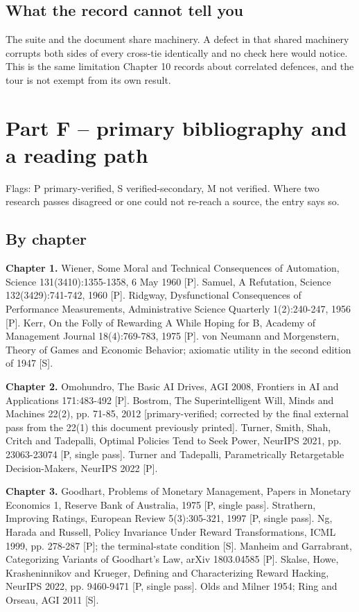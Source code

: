 \section*{What the record cannot tell you}

The suite and the document share machinery. A defect in that shared machinery corrupts both sides of every cross-tie identically and no check here would notice. This is the same limitation Chapter 10 records about correlated defences, and the tour is not exempt from its own result.

\chapter*{Part F -- primary bibliography and a reading path}

Flags: P primary-verified, S verified-secondary, M not verified. Where two research passes disagreed or one could not re-reach a source, the entry says so.

\section*{By chapter}

\textbf{Chapter 1.} Wiener, Some Moral and Technical Consequences of Automation, Science 131(3410):1355-1358, 6 May 1960 [P]. Samuel, A Refutation, Science 132(3429):741-742, 1960 [P]. Ridgway, Dysfunctional Consequences of Performance Measurements, Administrative Science Quarterly 1(2):240-247, 1956 [P]. Kerr, On the Folly of Rewarding A While Hoping for B, Academy of Management Journal 18(4):769-783, 1975 [P]. von Neumann and Morgenstern, Theory of Games and Economic Behavior; axiomatic utility in the second edition of 1947 [S].

\textbf{Chapter 2.} Omohundro, The Basic AI Drives, AGI 2008, Frontiers in AI and Applications 171:483-492 [P]. Bostrom, The Superintelligent Will, Minds and Machines 22(2), pp. 71-85, 2012 [primary-verified; corrected by the final external pass from the 22(1) this document previously printed]. Turner, Smith, Shah, Critch and Tadepalli, Optimal Policies Tend to Seek Power, NeurIPS 2021, pp. 23063-23074 [P, single pass]. Turner and Tadepalli, Parametrically Retargetable Decision-Makers, NeurIPS 2022 [P].

\textbf{Chapter 3.} Goodhart, Problems of Monetary Management, Papers in Monetary Economics 1, Reserve Bank of Australia, 1975 [P, single pass]. Strathern, Improving Ratings, European Review 5(3):305-321, 1997 [P, single pass]. Ng, Harada and Russell, Policy Invariance Under Reward Transformations, ICML 1999, pp. 278-287 [P]; the terminal-state condition [S]. Manheim and Garrabrant, Categorizing Variants of Goodhart's Law, arXiv 1803.04585 [P]. Skalse, Howe, Krasheninnikov and Krueger, Defining and Characterizing Reward Hacking, NeurIPS 2022, pp. 9460-9471 [P, single pass]. Olds and Milner 1954; Ring and Orseau, AGI 2011 [S].

